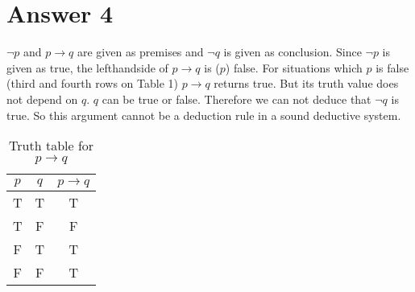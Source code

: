 \documentclass[12pt]{article}
\begin{document}
\section*{Answer 4}
$ \neg p$ and $ p \rightarrow q$ are given as premises and $ \neg q $ is given as conclusion. Since $ \neg p$ is given as true, the lefthandside of $p \rightarrow q$ is ($p$) false. For situations which $p$ is false (third and fourth rows on Table 1) $ p \rightarrow q$ returns true. But its truth value does not depend on $ q $. $q$ can be true or false. Therefore we can not deduce that $ \neg q$ is true. So this argument cannot be a deduction rule in a sound deductive system.\\
\begin{table}[H]
\small
\caption{ Truth table for $p \rightarrow q$ }
\centering
\begin{tabular}{|c|c|c|}	
\hline
$p$ & $q$ & $p\rightarrow q$\\
\hline 
T & T & T \\			
T & F & F \\
F & T & T \\
F & F & T \\
\hline 
\end{tabular}
\end{table}
\end{document}
